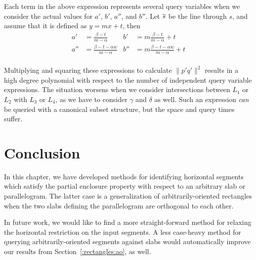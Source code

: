 Each term in the above expression represents several query variables when we consider the actual values for $a'$, $b'$, $a''$, and $b''$.  
Let $\overline{s}$ be the line through $s$, and assume that it is defined as $y = mx + t$, then
\begin{align*}
a'  &= \frac{\beta - t}{m - \alpha}
&b'  &= m \frac{\beta - t}{m - \alpha} + t \\
a'' &= \frac{\beta - t - \alpha w}{m - \alpha} 
&b'' &= m \frac{\beta - t - \alpha w}{m - \alpha} + t \\
\end{align*}

Multiplying and squaring these expressions to calculate $\|p'q'\|^2$ results in a high degree polynomial with respect to the number of independent query variable expressions.
The situation worsens when we consider intersections between $L_1$ or $L_2$ with $L_3$ or $L_4$, as we have to consider $\gamma$ and $\delta$ as well.
Such an expression \emph{can} be queried with a canonical subset structure, but the space and query times suffer.

\section{Conclusion}
\label{:slabs:concl}

In this chapter, we have developed methods for identifying horizontal segments which satisfy the partial enclosure property with respect to an arbitrary slab or parallelogram.
The latter case is a generalization of arbitrarily-oriented rectangles when the two slabs defining the parallelogram are orthogonal to each other.

In future work, we would like to find a more straight-forward method for relaxing the horizontal restriction on the input segments.  
A less case-heavy method for querying arbitrarily-oriented segments against slabs would automatically improve our results from Section~\ref{:rectangles:ao}, as well.
